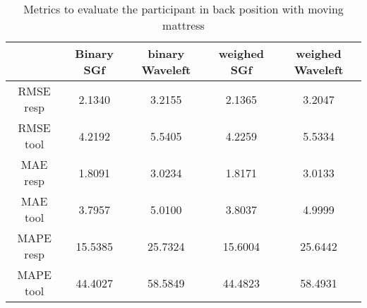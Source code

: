 \begin{table}[h]

    \centering

\begin{tabular}{|c|c|c|c|c|}
\hline 
& Binary SGf & binary Waveleft & weighed  SGf & weighed Waveleft \\ 
 
\hline 
RMSE resp &  2.1340  &  3.2155  &  2.1365  &  3.2047 \\ 
RMSE tool &     4.2192  &  5.5405  &  4.2259   & 5.5334 \\  
MAE resp & 1.8091 &   3.0234 &     1.8171 &  3.0133 \\ 
MAE tool &     3.7957 & 5.0100 & 3.8037 &  4.9999 \\  
MAPE resp & 15.5385 & 25.7324 & 15.6004 & 25.6442 \\ 
MAPE tool & 44.4027 & 58.5849 & 44.4823 & 58.4931 \\ 

\hline 
\end{tabular}

\caption{Metrics to evaluate the participant in back position with moving mattress}
\end{table}

